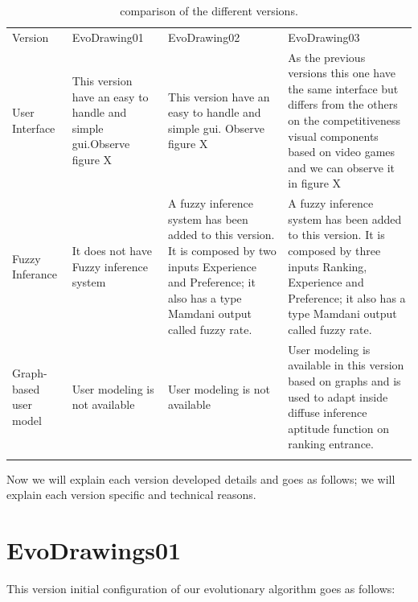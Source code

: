 \begin{table}
	\small
	\caption{comparison of the different versions.}
	\label{tab:comparison} 
	\centering
	\small
	\begin{tabular}{p{3cm} p{4cm} p{4cm} p{4cm} }
		\hline\noalign{\smallskip}
		Version & EvoDrawing01 & EvoDrawing02 & EvoDrawing03 \\
		\noalign{\smallskip}\hline\noalign{\smallskip}
		\small{User Interface} & \small{This version have an easy to handle and simple gui.Observe figure X} & \small{This version have an easy to handle and simple gui. Observe figure X} & \small{As the previous versions this one have the same interface but differs from the others on the competitiveness visual components based on video games and we can observe it in figure X}\\ \hline
		\small{Fuzzy Inferance} & \small{It does not have Fuzzy inference system} & \small{A fuzzy inference system has been added to this version.  It is composed by two inputs Experience and Preference; it also has a type Mamdani output called fuzzy rate.} & \small{A fuzzy inference system has been added to this version.  It is composed by three inputs Ranking, Experience and Preference; it also has a type Mamdani output called fuzzy rate.
			}\\ \hline 
		\small{Graph-based user model} & \small{User modeling is not available} & \small{User modeling is not available} & \small{User modeling is available in this version based on graphs and is used to adapt inside diffuse inference aptitude function on ranking entrance.
		}\\ \hline 
		
		\noalign{\smallskip}\hline
	\end{tabular}
\end{table}

Now we will explain each version developed details and goes as follows; we will explain each version specific and technical reasons.





\section{EvoDrawings01} 


This version initial configuration of our evolutionary algorithm goes as follows:

